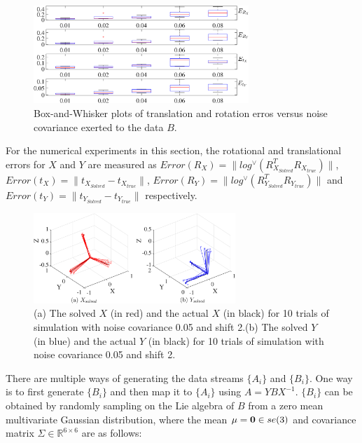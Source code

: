 \documentclass[letterpaper, 10 pt, conference]{ieeeconf}  %
\begin{document}
\begin{figure}
\centering
\includegraphics[width=3.2in]{fig3.eps}
\caption{
Box-and-Whisker plots  of translation and rotation erros versus noise covariance exerted to the data $B$.\vspace{6pt}
}
\label{fig3}
\end{figure}


For the numerical experiments in this section, the rotational and translational errors for $X$ and $Y$ are measured as  $Error(R_X) = \parallel log^{\vee} (R_{X_{Solved}}^{T}R_{X_{true}})\parallel$, $Error(t_X) = \parallel t_{X_{Solved}}-t_{X_{true}} \parallel$, $Error(R_Y) = \parallel log^{\vee} (R_{Y_{Solved}}^{T}R_{Y_{true}})\parallel$ and $Error(t_Y) = \parallel t_{Y_{Solved}}-t_{Y_{true}} \parallel$ respectively.

\begin{center}
\begin{figure}
\centering
\includegraphics[width=3in]{fig4.eps}
\caption{
(a) The solved $X$ (in red) and the actual $X$ (in black) for 10 trials of simulation with noise covariance 0.05 and shift 2.(b) The solved $Y$ (in blue) and the actual $Y$ (in black) for 10 trials of simulation with noise covariance 0.05 and shift 2.
}
\label{fig4}
\end{figure}
\end{center}

There are multiple ways of generating the data streams $\{A_i\}$ and $\{B_{i}\}$. One way is to first generate $\{B_i\}$ and then map it to $\{A_i\}$ using $A = YBX^{-1}$. $\{B_i\}$ can be obtained by randomly sampling on the Lie algebra of $B$ from a zero mean multivariate Gaussian distribution, where the mean $\mu = {\bf 0} \in se(3)$ and covariance matrix $\Sigma \in \mathbb{R}^{6 \times 6}$ are as follows:
\end{document}
